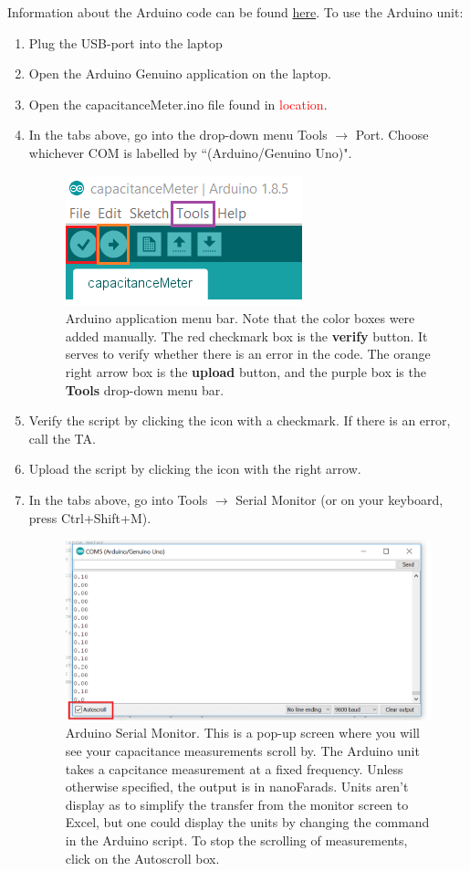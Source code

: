 \documentclass[12pt]{report}
\def \todo #1{\textcolor{red}{#1}}
\begin{document}
\noindent Information about the Arduino code can be found \href{https://www.arduino.cc/en/Tutorial/CapacitanceMeter}{here}. To use the Arduino unit:
\begin{enumerate}
\item Plug the USB-port into the laptop
\item Open the Arduino Genuino application on the laptop.
\item Open the capacitanceMeter.ino file found in \todo{location}.

\item In the tabs above, go into the drop-down menu Tools $\rightarrow$ Port. Choose whichever COM is labelled by ``(Arduino/Genuino Uno)".
\begin{figure}[H]
\centering
\includegraphics[width=0.5 \textwidth]{lab1-Arduino-menu-bar.png}
\caption{Arduino application menu bar. Note that the color boxes were added manually. The red checkmark box is the \textbf{verify} button. It serves to verify whether there is an error in the code. The orange right arrow box is the \textbf{upload} button, and the purple box is the \textbf{Tools} drop-down menu bar.}
\label{Fig:ArduinoMenuBar}
\end{figure}

\item Verify the script by clicking the icon with a checkmark. If there is an error, call the TA.
\item Upload the script by clicking the icon with the right arrow.
\item In the tabs above, go into Tools $\rightarrow$ Serial Monitor (or on your keyboard, press Ctrl+Shift+M).
\begin{figure}[h]
\centering
\includegraphics[width=0.85 \textwidth]{lab1-Arduino-monitor.png}
\caption{Arduino Serial Monitor. This is a pop-up screen where you will see your capacitance measurements scroll by. The Arduino unit takes a capcitance measurement at a fixed frequency. Unless otherwise specified, the output is in nanoFarads. Units aren't display as to simplify the transfer from the monitor screen to Excel, but one could display the units by changing the command in the Arduino script. To stop the scrolling of measurements, click on the Autoscroll box.}
\label{Fig:Arduino-Monitor}
\end{figure}


\end{enumerate}
\end{document}
